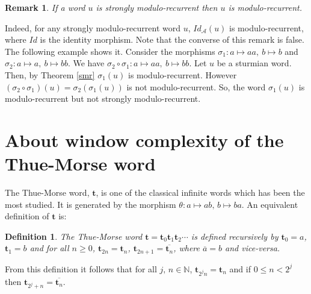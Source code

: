\documentclass[a4 paper,12pt]{article}
\newtheorem{remark}{Remark}[section]
\newtheorem{definition}{Definition}[section]
\begin{document}
\begin{remark}  
If a word $u$ is strongly modulo-recurrent then $u$ is modulo-recurrent.
\end{remark}

Indeed, for any strongly modulo-recurrent word $u$, $Id_{\mathcal{A}}(u)$ is modulo-recurrent, where $Id$ is the identity morphism.
Note that the converse of this remark is false. The  following example shows it. Consider the morphisms $\sigma_1: a\mapsto aa,\ b\mapsto b$ and $\sigma_2: a\mapsto a,\ b\mapsto bb$. We have $\sigma_2\circ\sigma_1: a\mapsto aa,\ b\mapsto bb$. Let $u$ be a sturmian word. Then, by Theorem \ref{smr} $\sigma_1(u)$ is modulo-recurrent. However $\left(\sigma_2\circ\sigma_1\right)(u)=\sigma_2\left(\sigma_1\left(u\right)\right)$ is not modulo-recurrent. So, the word $\sigma_1(u)$  is modulo-recurrent but not strongly modulo-recurrent.


 \section{About  window complexity of the Thue-Morse word}




The Thue-Morse  word, $\mathbf{t}$, is one of the classical infinite words which has been the most studied. It is   generated by the morphism  $\theta : a\mapsto ab,\, b\mapsto ba$. An equivalent definition of $\mathbf{t}$ is:
\begin{definition} The Thue-Morse word $\mathbf{t}=\mathbf{t}_0\mathbf{t}_1\mathbf{t}_2\cdots$ is defined recursively by $\mathbf{t}_0=a$, $\mathbf{t}_1=b$ and for all $n\geq 0$, $\mathbf{t}_{2n}=\mathbf{t}_n$, $\mathbf{t}_{2n+1}=\overline{\mathbf{t}_{n}}$, where $\overline{a}=b$ and vice-versa.


\end{definition}

From this definition it follows that for all $j,\,n\in \mathbb{N}$, $ \mathbf{t}_{2^{j}n}=\mathbf{t}_n$ and if $0\leq n<2^j$ then $\mathbf{t}_{2^{j}+n}=\overline{\mathbf{t}_{n}}.$
\end{document}
